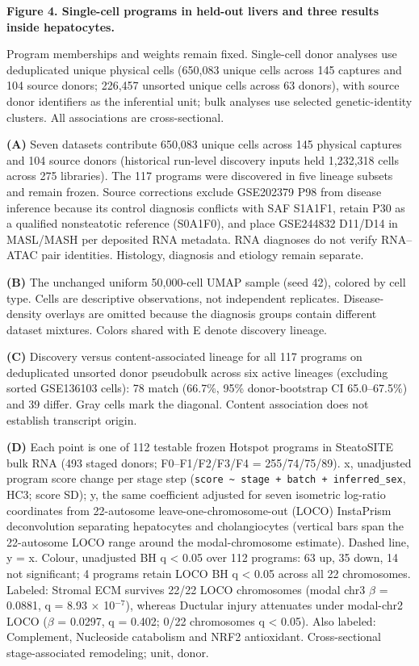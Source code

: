 \textbf{Figure 4. Single-cell programs in held-out livers and three results inside hepatocytes.}

Program memberships and weights remain fixed. Single-cell donor analyses use deduplicated unique physical cells (650,083 unique cells across 145 captures and 104 source donors; 226,457 unsorted unique cells across 63 donors), with source donor identifiers as the inferential unit; bulk analyses use selected genetic-identity clusters. All associations are cross-sectional.

\textbf{(A)} Seven datasets contribute 650,083 unique cells across 145 physical captures and 104 source donors (historical run-level discovery inputs held 1,232,318 cells across 275 libraries). The 117 programs were discovered in five lineage subsets and remain frozen. Source corrections exclude GSE202379 P98 from disease inference because its control diagnosis conflicts with SAF S1A1F1, retain P30 as a qualified nonsteatotic reference (S0A1F0), and place GSE244832 D11/D14 in MASL/MASH per deposited RNA metadata. RNA diagnoses do not verify RNA--ATAC pair identities. Histology, diagnosis and etiology remain separate.

\textbf{(B)} The unchanged uniform 50,000-cell UMAP sample (seed 42), colored by cell type. Cells are descriptive observations, not independent replicates. Disease-density overlays are omitted because the diagnosis groups contain different dataset mixtures. Colors shared with E denote discovery lineage.

\textbf{(C)} Discovery versus content-associated lineage for all 117 programs on deduplicated unsorted donor pseudobulk across six active lineages (excluding sorted GSE136103 cells): 78 match (66.7\%, 95\% donor-bootstrap CI 65.0--67.5\%) and 39 differ. Gray cells mark the diagonal. Content association does not establish transcript origin.

\textbf{(D)} Each point is one of 112 testable frozen Hotspot programs in SteatoSITE bulk RNA (493 staged donors; F0--F1/F2/F3/F4 = 255/74/75/89). x, unadjusted program score change per stage step (\texttt{score\ \textasciitilde{}\ stage\ +\ batch\ +\ inferred\_\allowbreak{}sex}, HC3; score SD); y, the same coefficient adjusted for seven isometric log-ratio coordinates from 22-autosome leave-one-chromosome-out (LOCO) InstaPrism deconvolution separating hepatocytes and cholangiocytes (vertical bars span the 22-autosome LOCO range around the modal-chromosome estimate). Dashed line, y = x. Colour, unadjusted BH q \textless{} 0.05 over 112 programs: 63 up, 35 down, 14 not significant; 4 programs retain LOCO BH q \textless{} 0.05 across all 22 chromosomes. Labeled: Stromal ECM survives 22/22 LOCO chromosomes (modal chr3 $\beta$ = 0.0881, q = 8.93 $\times$ 10$^{-7}$), whereas Ductular injury attenuates under modal-chr2 LOCO ($\beta$ = 0.0297, q = 0.402; 0/22 chromosomes q \textless{} 0.05). Also labeled: Complement, Nucleoside catabolism and NRF2 antioxidant. Cross-sectional stage-associated remodeling; unit, donor.

